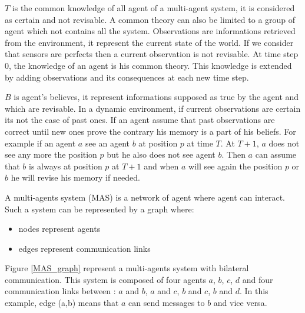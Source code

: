 \documentclass{aamas2012}
\begin{document}
	$T$ is the common knowledge of all agent of a multi-agent system, it is considered as certain and not revisable.
	A common theory can also be limited to a group of agent which not contains all the system.
	Observations are informations retrieved from the environment, it represent the current state of the world.
	If we consider that sensors are perfects then a current observation is not revisable.
	At time step 0, the knowledge of an agent is his common theory.
	This knowledge is extended by adding observations and its consequences at each new time step.

	$B$ is agent's believes, it represent informations supposed as true by the agent and which are revisable.
	In a dynamic environment, if current observations are certain its not the case of past ones.
	If an agent assume that past observations are correct until new ones prove the contrary his memory is a part of his beliefs.
	For example if an agent $a$ see an agent $b$ at position $p$ at time $T$.
	At $T+1$, $a$ does not see any more the position $p$ but he also does not see agent $b$.
	Then $a$ can assume that $b$ is always at position $p$ at $T+1$ and when $a$ will see again the position $p$ or $b$ he will revise his memory if needed.
	
	\begin{definition}
		A multi-agents system (MAS) is a network of agent where agent can interact.
		Such a system can be represented by a graph where:
		\begin{itemize}
			\item nodes represent agents
			\item edges represent communication links
		\end{itemize}
	\end{definition}
	
	Figure \ref{MAS_graph} represent a multi-agents system with bilateral communication.
	This system is composed of four agents $a$, $b$, $c$, $d$ and four communication links between : $a$ and $b$, $a$ and $c$, $b$ and $c$, $b$ and $d$. 
	In this example, edge (a,b) means that $a$ can send messages to $b$ and vice versa.
	
\end{document}
